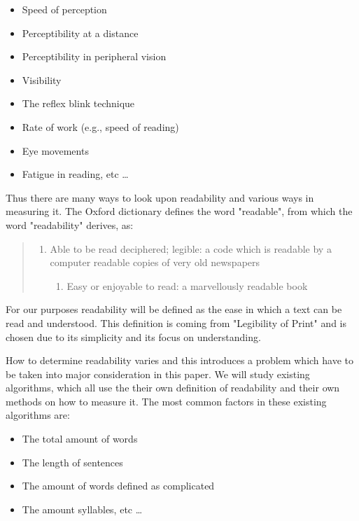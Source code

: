 \documentclass[a4paper]{article}
\begin{document}
\begin{itemize}
  \item Speed of perception
  \item Perceptibility at a distance
  \item Perceptibility in peripheral vision
  \item Visibility
  \item The reflex blink technique
  \item Rate of work (e.g., speed of reading)
  \item Eye movements
  \item Fatigue in reading, etc \ldots
\end{itemize}

Thus there are many ways to look upon readability and various ways in measuring it. The Oxford dictionary defines the word "readable", from which the word "readability" derives, as:

\begin{quote}
    \begin{enumerate}
        \item Able to be read deciphered; legible: a code which is readable by a computer readable copies of very old newspapers
        \begin{enumerate}
            \item Easy or enjoyable to read: a marvellously readable book
        \end{enumerate}
    \end{enumerate}
\end{quote}

For our purposes readability will be defined as the ease in which a text can be read and understood. This definition is coming from "Legibility of Print" \cite{tinker63} and is chosen due to its simplicity and its focus on understanding. 

How to determine readability varies and this introduces a problem which have to be taken into major consideration in this paper. We will study existing algorithms, which all use the their own definition of readability and their own methods on how to measure it. The most common factors in these existing algorithms are: 

\begin{itemize}
    \item The total amount of words
    \item The length of sentences
    \item The amount of words defined as complicated
    \item The amount syllables, etc \ldots
\end{itemize}
\end{document}
